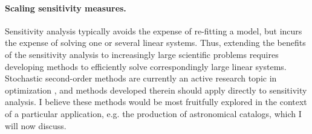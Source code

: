 %


\paragraph{Scaling sensitivity measures.}

Sensitivity analysis typically avoids the expense of re-fitting a model, but
incurs the expense of solving one or several linear systems.  Thus, extending
the benefits of the sensitivity analysis to increasingly large scientific
problems requires developing methods to efficiently solve correspondingly large
linear systems.  Stochastic second-order methods are currently an active
research topic in optimization \citep{agarwal:2017:secondorder,
berahas:2020:newtonsketch}, and methods developed therein should apply
directly to sensitivity analysis.  I believe these methods would be most
fruitfully explored in the context of a particular application, e.g.
the production of astronomical catalogs, which I will now discuss.

